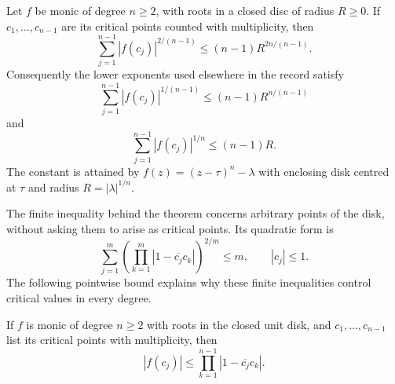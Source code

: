 \begin{theorem}
\label{res:critical-value-budget}
Let $f$ be monic of degree $n\ge2$, with roots in a closed disc of radius
$R\ge0$.  If $c_1,\ldots,c_{n-1}$ are its critical points counted with
multiplicity, then
\begin{equation}\label{eq:critical-value-quadratic-budget}
 \sum_{j=1}^{n-1}|f(c_j)|^{2/(n-1)}
 \le(n-1)R^{2n/(n-1)}.
\end{equation}
Consequently the lower exponents used elsewhere in the record satisfy
\begin{equation}\label{eq:critical-value-power-budget}
 \sum_{j=1}^{n-1}|f(c_j)|^{1/(n-1)}
 \le(n-1)R^{n/(n-1)}
\end{equation}
and
\[
 \sum_{j=1}^{n-1}|f(c_j)|^{1/n}\le(n-1)R.
\]
The constant is attained by $f(z)=(z-\tau)^n-\lambda$ with enclosing
disk centred at $\tau$ and radius $R=|\lambda|^{1/n}$.
\end{theorem}

The finite inequality behind the theorem concerns arbitrary points of the
disk, without asking them to arise as critical points.  Its quadratic form is
\[
 \sum_{j=1}^m\left(\prod_{k=1}^m
       |1-\overline{c_j}c_k|\right)^{2/m}\le m,
 \qquad |c_j|\le1.
\]
The following pointwise bound explains why these finite inequalities
control critical values in every degree.

\begin{lemma}\label{res:reflected-critical-value}
If $f$ is monic of degree $n\ge2$ with roots in the closed unit disk,
and $c_1,\ldots,c_{n-1}$ list its critical points with multiplicity, then
\begin{equation}\label{eq:critical-reflected-product}
 |f(c_j)|\le\prod_{k=1}^{n-1}|1-\overline{c_j}c_k|.
\end{equation}
\end{lemma}

